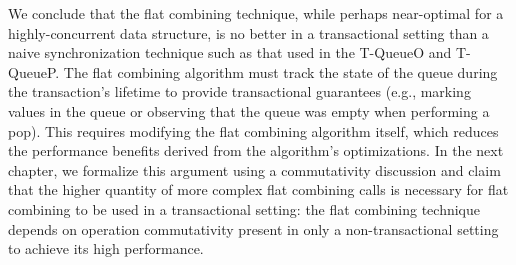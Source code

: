 We conclude that the flat combining technique, while perhaps near-optimal for a highly-concurrent data structure, is no better in a transactional setting than a naive synchronization technique such as that used in the T-QueueO and T-QueueP. The flat combining algorithm must track the state of the queue during the transaction's lifetime to provide transactional guarantees (e.g., marking values in the queue or observing that the queue was empty when performing a pop). This requires modifying the flat combining algorithm itself, which reduces the performance benefits derived from the algorithm's optimizations. In the next chapter, we formalize this argument using a commutativity discussion and claim that the higher quantity of more complex flat combining calls is necessary for flat combining to be used in a transactional setting: the flat combining technique depends on operation commutativity present in only a non-transactional setting to achieve its high performance. 

\iffalse
For ease of reference, we list here the names of queues discussed in this section. Their meaning is explained in context with more detail within the discussion.
\begin{itemize}
    \item T-QueueO: the optimistic, transactional, and naively-concurrent queue.
    \item T-QueueP: the transactional and naively-concurrent queue that performs pessimistic locking upon performing a pop.
    \item NT-FCQueue: the non-transactional flat combining queue.
    \item NT-FCQueueWrapped: a version of NT-FCQueue that invokes STO \texttt{start\_transaction} and \texttt{commit\_transaction} calls.
    \item T-FCQueue: the fully-transactional flat-combining queue.
\end{itemize}

\fi
